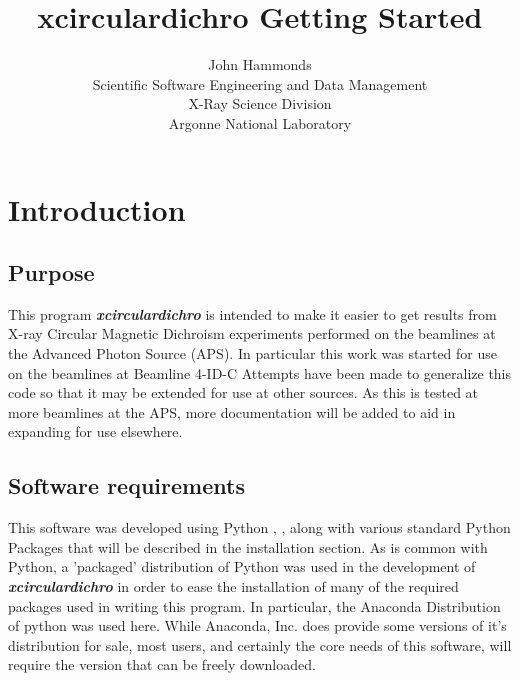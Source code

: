 \documentclass[12pt,letterpaper, openany]{book}
\begin{document}
\begin{titlepage}


\title{xcirculardichro Getting Started}
\author{John Hammonds \\
Scientific Software Engineering and Data Management \\
X-Ray Science Division \\
Argonne National Laboratory}


\end{titlepage}

\maketitle
\tableofcontents
\listoffigures
\chapter{Introduction}

\section{Purpose}
This program \textbf{\textit{xcirculardichro}} is intended to make it easier to
get results from X-ray Circular Magnetic Dichroism
\cite{Bouldi1} experiments
performed on the beamlines at the Advanced Photon Source
(APS)\cite{APS}.
In particular this work was started for use on the beamlines at Beamline 4-ID-C
\cite{FOUR-IDC}
Attempts have been made to generalize this code so that it may be extended for 
use at other sources.  As this is tested at more beamlines at the APS, more 
documentation will be added to aid in expanding for use elsewhere.

\section{Software requirements}
This software was developed using Python\textsuperscript{\textregistered} 
\cite{PYTHONWEB}, \cite{PYTHONLANGREF}, along with various standard Python Packages that will be described in the installation section.  As is common with Python, a 'packaged' distribution of Python was used in the development of \textbf{\textit{xcirculardichro}} in order to ease the installation of many of the required packages used in writing this program.  In particular, the Anaconda \cite{ANACONDAPYTHON}Distribution of python was used here.  While Anaconda, Inc. does provide some versions of it's distribution for sale, most users, and certainly the core needs of this software, will require the version that can be freely downloaded.  
\end{document}
